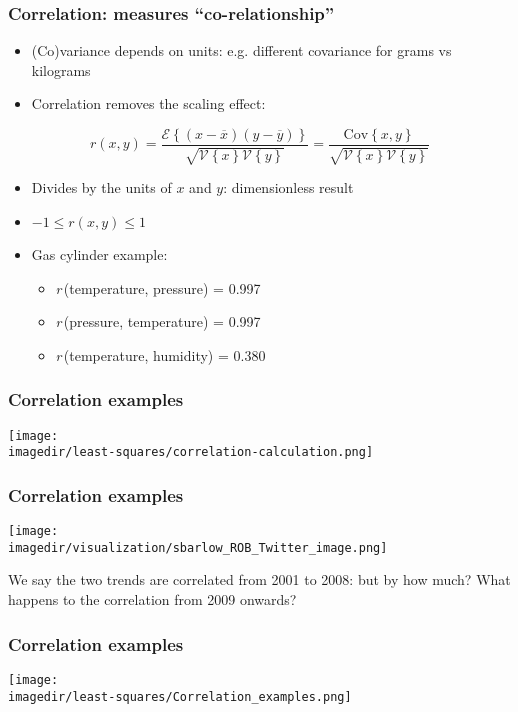 \begin{frame}\frametitle{Correlation: measures ``co-relationship''}
	\begin{itemize}
		\item	(Co)variance depends on units: e.g. different covariance for grams vs kilograms
		\item	Correlation removes the scaling effect:
	\end{itemize}

	$$r(x, y) = \dfrac{\mathcal{E}\left\{ (x - \overline{x}) (y - \overline{y})\right\}}{\sqrt{\mathcal{V}\left\{x\right\}\mathcal{V}\left\{y\right\}}} = \dfrac{\text{Cov}\left\{x, y\right\}}{\sqrt{\mathcal{V}\left\{x\right\}\mathcal{V}\left\{y\right\}}}$$
	\begin{itemize}
		\item	Divides by the units of $x$ and $y$: dimensionless result
		\item	$-1 \leq r(x,y) \leq 1$
	\end{itemize}
	\begin{itemize}
		\item	Gas cylinder example:
		\begin{itemize}
			\item	\emph{r}\,(temperature, pressure) = 0.997
			\item	\emph{r}\,(pressure, temperature) = 0.997
			\item	\emph{r}\,(temperature, humidity) = 0.380
		\end{itemize}
	\end{itemize}
\end{frame}

\begin{frame}\frametitle{Correlation examples}
	\begin{center}
		\texttt{[image: \\imagedir/least-squares/correlation-calculation.png]}
	\end{center}
\end{frame}

\begin{frame}\frametitle{Correlation examples}
	\begin{center}
		\texttt{[image: \\imagedir/visualization/sbarlow\_ROB\_Twitter\_image.png]}
	\end{center}
	We say the two trends are correlated from 2001 to 2008: but by how much? What happens to the correlation from 2009 onwards?
\end{frame}

\begin{frame}\frametitle{Correlation examples}
	\begin{center}
		\texttt{[image: \\imagedir/least-squares/Correlation\_examples.png]}
	\end{center}
\end{frame}

